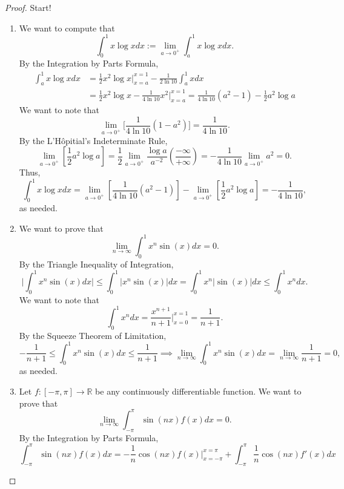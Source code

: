 \documentclass[12pt]{article}
\theoremstyle{definition}
\begin{document}
\begin{proof}
    Start!
    \begin{enumerate}[label=(\alph*)]
        \item We want to compute that
        \[
            \int_{0}^{1}x\log{x}dx := \lim_{a \to 0^{+}} \int_{a}^{1} x\log{x}dx.
        \]
        By the Integration by Parts Formula,
        \begin{align*}
            \int_{a}^{1}x\log{x}dx &= \frac{1}{2}x^2\log{x} \bigg\vert_{x = a}^{x = 1} - \frac{1}{2\ln{10}}\int_{a}^{1}xdx \\
            &= \frac{1}{2}x^2\log{x} - \frac{1}{4\ln{10}}x^2 \bigg\vert_{x = a}^{x = 1} = \frac{1}{4\ln{10}}(a^2 - 1) - \frac{1}{2}a^2\log{a}
        \end{align*}
        We want to note that
        \[
            \lim_{a \to 0^{+}}\bigg[\frac{1}{4\ln{10}}(1 - a^2)\bigg] = \frac{1}{4\ln{10}}.
        \]
        By the L'Hôpitial's Indeterminate Rule,
        \[
            \lim_{a \to 0^{+}}\left[\frac{1}{2}a^2\log{a}\right] = \frac{1}{2}\lim_{a \to 0^{+}}\frac{\log{a}}{a^{-2}} \left(\frac{-\infty}{+\infty}\right) = -\frac{1}{4\ln{10}}\lim_{a \to 0^{+}}a^2 = 0.
        \]
        Thus,
        \[
            \int_{0}^{1}x\log{x}dx = \lim_{a \to 0^{+}}\left[\frac{1}{4\ln{10}}(a^2 - 1)\right] - \lim_{a \to 0^{+}}\left[\frac{1}{2}a^2\log{a}\right] = -\frac{1}{4\ln{10}}, 
        \]
        as needed.
        \item We want to prove that
        \[
            \lim_{n \to \infty}\int_{0}^{1}x^n\sin(x)dx = 0.
        \]
        By the Triangle Inequality of Integration,
        \[
            \bigg\vert \int_{0}^{1} x^n\sin(x) dx \bigg\vert \leq \int_{0}^{1} \vert x^n\sin(x) \vert dx = \int_{0}^{1}x^n \vert \sin(x) \vert dx \leq \int_{0}^{1} x^n dx.
        \]
        We want to note that
        \[
            \int_{0}^{1} x^n dx = \frac{x^{n + 1}}{n + 1} \bigg\vert_{x = 0}^{x = 1} = \frac{1}{n + 1}.
        \]
        By the Squeeze Theorem of Limitation,
        \[
            -\frac{1}{n + 1} \leq \int_{0}^{1} x^n\sin(x) dx \leq \frac{1}{n + 1}  \implies \lim_{n \to \infty} \int_{0}^{1} x^n\sin(x) dx = \lim_{n \to \infty} \frac{1}{n + 1} = 0,
        \]
        as needed.
        \item Let \(f : [-\pi, \pi] \to \mathbb{R}\) be any continuously differentiable function. We want to prove that
        \[
            \lim_{n \to \infty} \int_{-\pi}^{\pi} \sin(nx)f(x)dx = 0.
        \]
        By the Integration by Parts Formula,
        \[
            \int_{-\pi}^{\pi} \sin(nx)f(x) dx = -\frac{1}{n}\cos(nx)f(x) \bigg\vert_{x = -\pi}^{x = \pi} + \int_{-\pi}^{\pi} \frac{1}{n} \cos(nx)f'(x) dx
\]
\end{enumerate}
\end{proof}
\end{document}
